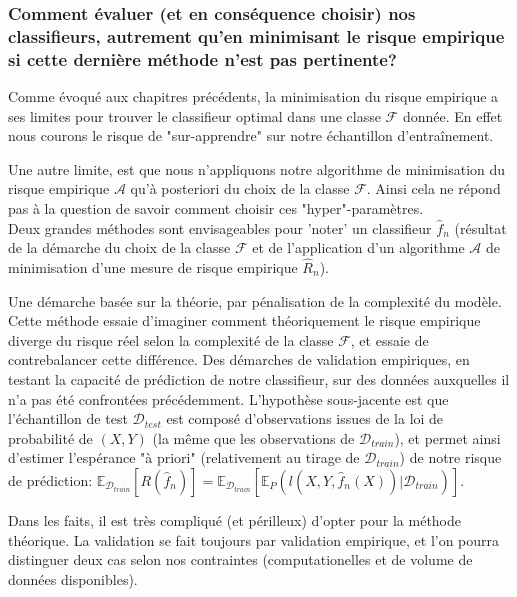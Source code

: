 \documentclass[a4paper]{article}
\theoremstyle{plain}
\begin{document}
\subsubsection{Comment évaluer (et en conséquence choisir) nos classifieurs, autrement qu'en minimisant le risque empirique si cette dernière méthode n'est pas pertinente?}

Comme évoqué aux chapitres précédents, la minimisation du risque empirique a ses limites pour trouver le classifieur optimal dans une classe $\mathcal{F}$ donnée. En effet nous courons le risque de "sur-apprendre" sur notre échantillon d'entraînement. 

Une autre limite, est que nous n'appliquons notre algorithme de minimisation du risque empirique $\mathcal{A}$ qu'à posteriori du choix de la classe $\mathcal{F}$. Ainsi cela ne répond pas à la question de savoir comment choisir ces "hyper"-paramètres.\\

Deux grandes méthodes sont envisageables pour 'noter' un classifieur $\hat f_n$ (résultat de la démarche du choix de la classe $\mathcal{F}$ et de l'application d'un algorithme $\mathcal{A}$ de minimisation d'une mesure de risque empirique $\hat R_n$).
\begin{outline}
\1 Une démarche basée sur la théorie, par pénalisation de la complexité du modèle. Cette méthode essaie d'imaginer comment théoriquement le risque empirique diverge du risque réel selon la complexité de la classe $\mathcal{F}$, et essaie de contrebalancer cette différence.
\1 Des démarches de validation empiriques, en testant la capacité de prédiction de notre classifieur, sur des données auxquelles il n'a pas été confrontées précédemment. L'hypothèse sous-jacente est que l'échantillon de test $\mathcal{D}_{test}$ est composé d'observations issues de la loi de probabilité de $(X,Y)$ (la même que les observations de $\mathcal{D}_{train}$), et permet ainsi d'estimer l'espérance "à priori" (relativement au tirage de $\mathcal{D}_{train}$) de notre risque de prédiction: $\mathbb{E}_{\mathcal{D}_{train}}[R(\hat f_n)] =\mathbb{E}_{\mathcal{D}_{train}}[ \mathbb{E}_P(l(X,Y,\hat f_n(X))|\mathcal{D}_{train})]$.
\end{outline}

Dans les faits, il est très compliqué (et périlleux) d'opter pour la méthode théorique. La validation se fait toujours par validation empirique, et l'on pourra distinguer deux cas selon nos contraintes (computationelles et de volume de données disponibles).\\
\end{document}
